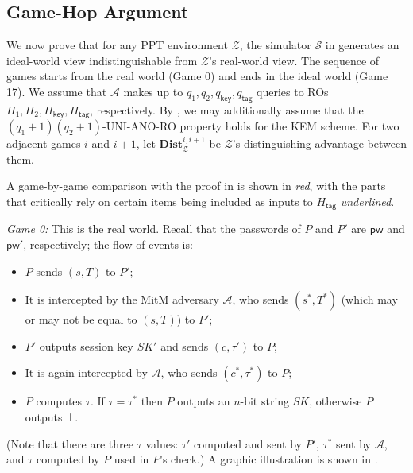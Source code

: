 \documentclass{article}
\theoremstyle{plain}
\theoremstyle{definition}
\theoremstyle{remark}
\newcommand{\adv}{\mathcal{A}}
\newcommand{\env}{\mathcal{Z}}
\renewcommand{\sim}{\mathcal{S}}
\newcommand{\Dist}{\mathbf{Dist}}
\newcommand{\Hkey}{H_\mathsf{key}}
\newcommand{\Htag}{H_\mathsf{tag}}
\newcommand{\pw}{\mathsf{pw}}
\newcommand{\qkey}{q_\mathsf{key}}
\newcommand{\qtag}{q_\mathsf{tag}}
\begin{document}
\subsection{Game-Hop Argument}
\label{sec:games}
We now prove that for any PPT environment $\env$, the simulator $\sim$ in  generates an ideal-world view indistinguishable from $\env$'s real-world view. The sequence of games starts from the real world (Game 0) and ends in the ideal world (Game 17). We assume that $\adv$ makes up to $q_1,q_2,\qkey,\qtag$ queries to ROs $H_1,H_2,\Hkey,\Htag$, respectively. By , we may additionally assume that the $(q_1+1)(q_2+1)$-UNI-ANO-RO property holds for the KEM scheme. For two adjacent games $i$ and $i+1$, let $\Dist_\env^{i,i+1}$ be $\env$'s distinguishing advantage between them.

A game-by-game comparison with the proof in \cite[Section~5]{EPRINT:ArrBarJar25} is shown in \emph{{\color{red}red}}, with the parts that critically rely on certain items being included as inputs to $\Htag$ \emph{{\color{red}\ul{underlined}}}.

\medskip\noindent\emph{Game 0:} This is the real world. Recall that the passwords of $P$ and $P'$ are $\pw$ and $\pw'$, respectively; the flow of events is:
\begin{itemize}
  \item $P$ sends $(s,T)$ to $P'$;
  \item It is intercepted by the MitM adversary $\adv$, who sends $(s^*,T^*)$ (which may or may not be equal to $(s,T)$) to $P'$;
  \item $P'$ outputs session key $SK'$ and sends $(c,\tau')$ to $P$;
  \item It is again intercepted by $\adv$, who sends $(c^*,\tau^*)$ to $P$;
  \item $P$ computes $\tau$. If $\tau = \tau^*$ then $P$ outputs an $n$-bit string $SK$, otherwise $P$ outputs $\bot$.
\end{itemize}
(Note that there are three $\tau$ values: $\tau'$ computed and sent by $P'$, $\tau^*$ sent by $\adv$, and $\tau$ computed by $P$ used in $P$'s check.) A graphic illustration is shown in .
\end{document}
